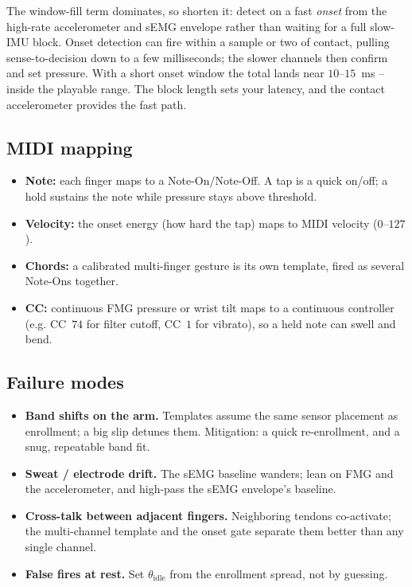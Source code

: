 The window-fill term dominates, so shorten it: detect on a fast \emph{onset} from the high-rate
accelerometer and sEMG envelope rather than waiting for a full slow-IMU block. Onset detection can
fire within a sample or two of contact, pulling sense-to-decision down to a few milliseconds; the
slower channels then confirm and set pressure. With a short onset window the total lands near
$10$--$15$~ms -- inside the playable range. The block length sets your latency, and
the contact accelerometer provides the fast path.

\subsection{MIDI mapping}

\begin{itemize}
  \item \textbf{Note:} each finger maps to a Note-On/Note-Off. A tap is a quick on/off; a hold
    sustains the note while pressure stays above threshold.
  \item \textbf{Velocity:} the onset energy (how hard the tap) maps to MIDI velocity ($0$--$127$).
  \item \textbf{Chords:} a calibrated multi-finger gesture is its own template, fired as several
    Note-Ons together.
  \item \textbf{CC:} continuous FMG pressure or wrist tilt maps to a continuous controller (e.g.
    CC~$74$ for filter cutoff, CC~$1$ for vibrato), so a held note can swell and bend.
\end{itemize}

\subsection{Failure modes}

\begin{itemize}
  \item \textbf{Band shifts on the arm.} Templates assume the same sensor placement as enrollment;
    a big slip detunes them. Mitigation: a quick re-enrollment, and a snug, repeatable band fit.
  \item \textbf{Sweat / electrode drift.} The sEMG baseline wanders; lean on FMG and the accelerometer,
    and high-pass the sEMG envelope's baseline.
  \item \textbf{Cross-talk between adjacent fingers.} Neighboring tendons co-activate; the
    multi-channel template and the onset gate separate them better than any single channel.
  \item \textbf{False fires at rest.} Set $\theta_{\text{idle}}$ from the enrollment spread, not by
    guessing.
\end{itemize}


